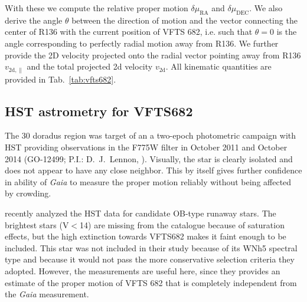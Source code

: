 \documentclass[apjl,twocolumn]{emulateapj}
\newcommand{\SdM}[1]{{{\color{brown}{#1}}}}
\begin{document}
With these we compute the relative proper motion
$\delta\mu_\mathrm{RA}$ and $\delta\mu_\mathrm{DEC}$.  We also derive
the angle $\theta$ between the direction of motion and the vector
connecting the center of R136 with the current position of VFTS 682,
i.e. such that $\theta = 0$ is the angle corresponding to perfectly
radial motion away from R136.    We further provide the 2D velocity
projected onto the radial vector pointing away from R136
$v_\mathrm{2d, \parallel}$  and the total projected 2d velocity
$v_\mathrm{2d}$.   All kinematic quantities are provided in
Tab.~\ref{tab:vfts682}. %



\subsection{HST astrometry for VFTS682}


The 30 doradus region was target of an a two-epoch photometric campaign with HST providing observations in the F775W filter in October 2011 and October 2014 (GO-12499; P.I.: D.~J.~Lennon, \citealt{sabbi:13}). Visually, the star is clearly isolated and does not appear to have any close neighbor. This by itself gives further confidence in ability of \emph{Gaia} to measure the proper motion reliably without being affected by crowding. 


 \citet{platais:18} recently analyzed the HST data for candidate
 OB-type runaway stars. The brightest stars (V$<$14) are missing from
 the catalogue because of saturation effects, but the high extinction
 towards VFTS682 makes it faint enough to be included.
 This star was not included in their study because of its WNh5
 spectral type and because it would not pass the more conservative
 selection criteria they adopted.
 However, the measurements are useful here, since they provides an
 estimate of the proper motion of VFTS 682 that is completely independent from the \emph{Gaia} measurement. 
 
\end{document}
